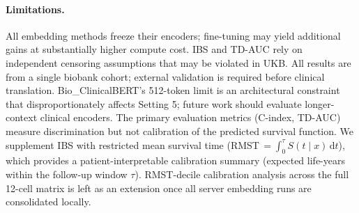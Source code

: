 \paragraph{Limitations.}
All embedding methods freeze their encoders; fine-tuning may yield
additional gains at substantially higher compute cost.
IBS and TD-AUC rely on independent censoring assumptions that may be
violated in UKB.
All results are from a single biobank cohort; external validation is
required before clinical translation.
Bio\_ClinicalBERT's 512-token limit is an architectural constraint that
disproportionately affects Setting 5; future work should evaluate
longer-context clinical encoders.
The primary evaluation metrics (C-index, TD-AUC) measure discrimination but not
calibration of the predicted survival function.
We supplement IBS with restricted mean survival time (RMST\,$= \int_0^\tau S(t\mid x)\,\mathrm{d}t$),
which provides a patient-interpretable calibration summary (expected life-years
within the follow-up window $\tau$).
RMST-decile calibration analysis across the full 12-cell matrix is left as
an extension once all server embedding runs are consolidated locally.
